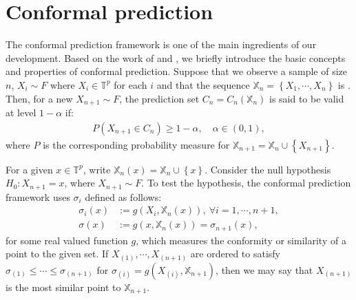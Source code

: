 \section{Conformal prediction}

The conformal prediction framework \citep{Vovk} is one of the main ingredients of our development. Based on the work of \citet{Vovk} and \citet{Lei:2013, Lei:2015}, we briefly introduce the basic concepts and properties of conformal prediction. Suppose that we observe a sample of size $n$, $X_i\sim F$ where $X_i\in \mathbb{T}^p$ for each $i$ and that the sequence $\mathbb{X}_n =\left\{X_1,\cdots,X_n\right\}$ is . Then, for a new $X_{n+1}\sim F$, the prediction set $C_n = C_n\left(\mathbb{X}_n\right)$ is said to be valid at level $1-\alpha$ if:
\begin{align}\label{eq:1}
    P\left(X_{n+1}\in C_n\right)\ge 1-\alpha,\quad \alpha\in \left(0,1\right),
\end{align}
where $P$ is the corresponding probability measure for $\mathbb{X}_{n+1}=\mathbb{X}_n\cup\left\{X_{n+1}\right\}$.

For a given $x\in \mathbb{T}^p$, write $\mathbb{X}_{n}(x)=\mathbb{X}_n\cup\left\{x\right\}$. Consider the null hypothesis $H_0: X_{n+1}=x$, where $X_{n+1}\sim F$. To test the hypothesis, the conformal prediction framework uses  $\sigma_i$ defined as follows:
\begin{align*}
    \sigma_i\left(x\right) &:= g\left(X_i, \mathbb{X}_{n}\left(x\right)\right),~ \forall i=1,\cdots,n+1,\\
    \sigma\left(x\right) &:=g\left(x, \mathbb{X}_{n}\left(x\right)\right) = \sigma_{n+1}\left(x\right),
\end{align*}
for some real valued function $g$, which measures the conformity or similarity of a point to the given set. If $X_{\left(1\right)},\cdots,X_{\left(n+1\right)}$ are ordered to satisfy $\sigma_{\left(1\right)}\le\cdots\le\sigma_{\left(n+1\right)}$ for $\sigma_{\left(i\right)} = g\left(X_{\left(i\right)}, \mathbb{X}_{n+1}\right)$, then we may say that $X_{\left(n+1\right)}$ is the most similar point to $\mathbb{X}_{n+1}$.

